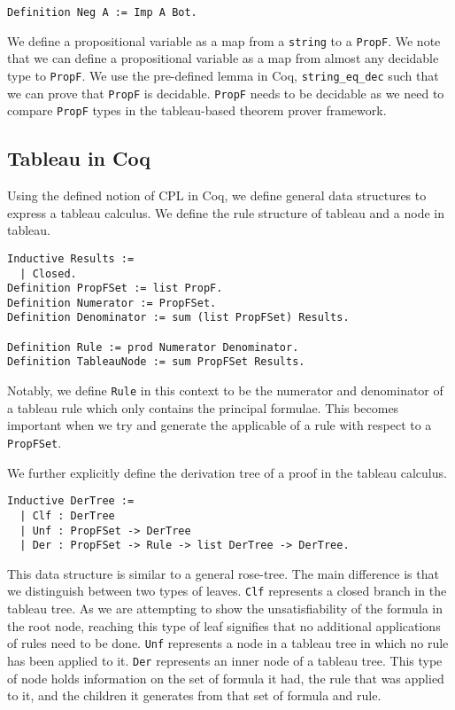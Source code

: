 \documentclass{llncs}
\begin{document}
\begin{verbatim}
Definition Neg A := Imp A Bot.
\end{verbatim}

We define a propositional variable as a map from a \verb+string+ to a
\verb+PropF+. We note that we can define a propositional variable as a map from
almost any decidable type to \verb+PropF+. We use the pre-defined lemma in Coq,
\verb+string_eq_dec+ such that we can prove that \verb+PropF+ is decidable.
\verb+PropF+ needs to be decidable as we need to compare \verb+PropF+ types in
the tableau-based theorem prover framework.

\subsection{Tableau in Coq}

Using the defined notion of CPL in Coq, we define general data structures to
express a tableau calculus. We define the rule structure of tableau and a node
in tableau.

\begin{verbatim}
Inductive Results :=
  | Closed.
Definition PropFSet := list PropF.
Definition Numerator := PropFSet.
Definition Denominator := sum (list PropFSet) Results.

Definition Rule := prod Numerator Denominator.
Definition TableauNode := sum PropFSet Results.
\end{verbatim}

Notably, we define \verb+Rule+ in this context to be the numerator and
denominator of a tableau rule which only contains the principal formulae. This
becomes important when we try and generate the applicable of a rule with
respect to a \verb+PropFSet+.

We further explicitly define the derivation tree of a proof in the tableau
calculus.

\begin{verbatim}
Inductive DerTree :=
  | Clf : DerTree
  | Unf : PropFSet -> DerTree
  | Der : PropFSet -> Rule -> list DerTree -> DerTree.
\end{verbatim}

This data structure is similar to a general rose-tree. The main difference is
that we distinguish between two types of leaves. \verb+Clf+ represents a closed
branch in the tableau tree. As we are attempting to show the unsatisfiability
of the formula in the root node, reaching this type of leaf signifies that no
additional applications of rules need to be done. \verb+Unf+ represents a node
in a tableau tree in which no rule has been applied to it. \verb+Der+
represents an inner node of a tableau tree. This type of node holds information
on the set of formula it had, the rule that was applied to it, and the children
it generates from that set of formula and rule.
\end{document}
